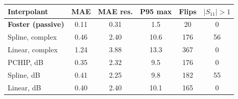 \begin{tabular}{lccccc}
\toprule
Interpolant & MAE & MAE res. & P95 max & Flips & $|S_{11}|{>}1$ \\
\midrule
\textbf{Foster (passive)} & 0.11 & 0.31 & 1.5 & 20 & 0 \\
Spline, complex & 0.46 & 2.40 & 10.6 & 176 & 56 \\
Linear, complex & 1.24 & 3.88 & 13.3 & 367 & 0 \\
PCHIP, dB & 0.35 & 2.32 & 9.5 & 176 & 0 \\
Spline, dB & 0.41 & 2.25 & 9.8 & 182 & 55 \\
Linear, dB & 0.40 & 2.40 & 10.1 & 165 & 0 \\
\bottomrule
\end{tabular}
